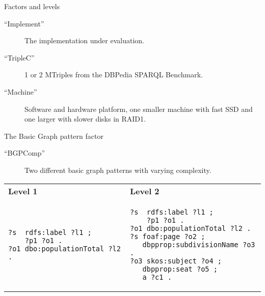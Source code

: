 \documentclass[english,handout,aspectratio=169]{ifislide}
\begin{document}
\begin{frame}{Factors and levels}
  \begin{description}
  \item [``Implement''] The implementation under evaluation.
  \item [``TripleC''] 1 or 2 MTriples from the DBPedia SPARQL
    Benchmark.
  \item [``Machine''] Software and hardware platform, one smaller
    machine with fast SSD and one larger with slower disks in RAID1.
  \end{description}
\end{frame}

\begin{frame}[fragile]{The Basic Graph pattern factor}
  \begin{description}

  \item [``BGPComp''] Two different basic graph patterns with varying
    complexity.
  \end{description}

  \begin{center}\small
    \begin{tabular}{|@{~~}p{}|@{~~}p{}|}
      \hline
      \textbf{Level 1} & \textbf{Level 2} \\[-2ex] 
      \begin{verbatim}
?s  rdfs:label ?l1 ;
    ?p1 ?o1 .
?o1 dbo:populationTotal ?l2 .
      \end{verbatim}
      & 
      \begin{verbatim}
?s  rdfs:label ?l1 ;
    ?p1 ?o1 .
?o1 dbo:populationTotal ?l2 .
?s foaf:page ?o2 ;
   dbpprop:subdivisionName ?o3 .
?o3 skos:subject ?o4 ;
   dbpprop:seat ?o5 ;
   a ?c1 .
\end{verbatim} 
\\      \hline
    \end{tabular}
  \end{center}

\end{frame}
\end{document}

